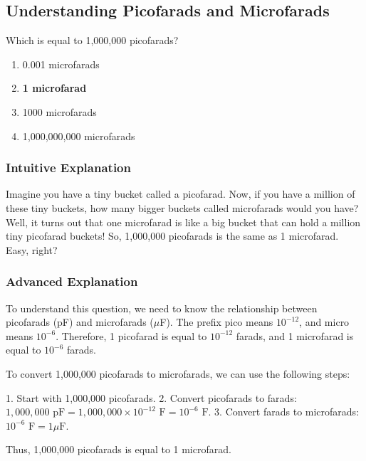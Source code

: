 \subsection{Understanding Picofarads and Microfarads}
\label{T5B08}

\begin{tcolorbox}[colback=gray!10!white,colframe=black!75!black,title=T5B08]
Which is equal to 1,000,000 picofarads?
\begin{enumerate}[label=\Alph*)]
    \item 0.001 microfarads
    \item \textbf{1 microfarad}
    \item 1000 microfarads
    \item 1,000,000,000 microfarads
\end{enumerate}
\end{tcolorbox}

\subsubsection{Intuitive Explanation}
Imagine you have a tiny bucket called a picofarad. Now, if you have a million of these tiny buckets, how many bigger buckets called microfarads would you have? Well, it turns out that one microfarad is like a big bucket that can hold a million tiny picofarad buckets! So, 1,000,000 picofarads is the same as 1 microfarad. Easy, right?

\subsubsection{Advanced Explanation}
To understand this question, we need to know the relationship between picofarads (pF) and microfarads ($\mu$F). The prefix pico means $10^{-12}$, and micro means $10^{-6}$. Therefore, 1 picofarad is equal to $10^{-12}$ farads, and 1 microfarad is equal to $10^{-6}$ farads.

To convert 1,000,000 picofarads to microfarads, we can use the following steps:

1. Start with 1,000,000 picofarads.
2. Convert picofarads to farads: $1,000,000 \text{ pF} = 1,000,000 \times 10^{-12} \text{ F} = 10^{-6} \text{ F}$.
3. Convert farads to microfarads: $10^{-6} \text{ F} = 1 \mu\text{F}$.

Thus, 1,000,000 picofarads is equal to 1 microfarad.

